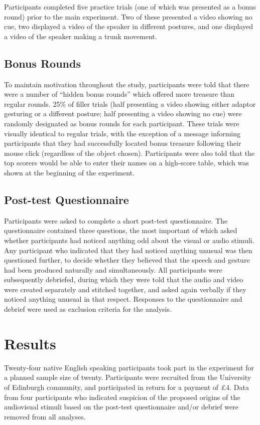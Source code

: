 \documentclass[a4paper,man,natbib]{apa6}
\begin{document}
Participants completed five practice trials (one of which was presented as a bonus round) prior to the main experiment. 
Two of these presented a video showing no cue, two displayed a video of the speaker in different postures, and one displayed a video of the speaker making a trunk movement.

\subsection{Bonus Rounds}
To maintain motivation throughout the study, participants were told that there were a number of ``hidden bonus rounds'' which offered more treasure than regular rounds.
25\% of filler trials (half presenting a video showing either adaptor gesturing or a different posture; half presenting a video showing no cue) were randomly designated as bonus rounds for each participant.
These trials were visually identical to regular trials, with the exception of a message informing participants that they had successfully located bonus treasure following their mouse click (regardless of the object chosen).
Participants were also told that the top scorers would be able to enter their names on a high-score table, which was shown at the beginning of the experiment. 

\subsection{Post-test Questionnaire}
Participants were asked to complete a short post-test questionnaire. 
The questionnaire contained three questions, the most important of which asked whether participants had noticed anything odd about the visual or audio stimuli.
Any participant who indicated that they had noticed anything unusual was then questioned further, to decide whether they believed that the speech and gesture had been produced naturally and simultaneously.
All participants were subsequently debriefed, during which they were told that the audio and video were created separately and stitched together, and asked again verbally if they noticed anything unusual in that respect. 
Responses to the questionnaire and debrief were used as exclusion criteria for the analysis.

\section{Results}
Twenty-four native English speaking participants took part in the experiment for a planned sample size of twenty.
Participants were recruited from the University of Edinburgh community, and participated in return for a payment of \pounds{}4.
Data from four participants who indicated suspicion of the proposed origins of the audiovisual stimuli based on the post-test questionnaire and/or debrief were removed from all analyses.
\end{document}
